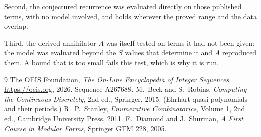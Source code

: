 \documentclass[11pt,a4paper]{article}
\theoremstyle{plain}
\theoremstyle{definition}
\begin{document}
Second, the conjectured recurrence was evaluated directly on those published terms, with no
model involved, and holds wherever the proved range and the data overlap.

Third, the derived annihilator $A$ was itself tested on terms it had not been given: the model
was evaluated beyond the $S$ values that determine it and $A$ reproduced them. A bound that is
too small fails this test, which is why it is run.

\begin{thebibliography}{9}
 The OEIS Foundation, \emph{The On-Line Encyclopedia of Integer
Sequences}, \url{https://oeis.org}, 2026. Sequence A267688.
 M.~Beck and S.~Robins, \emph{Computing the Continuous Discretely},
2nd ed., Springer, 2015. (Ehrhart quasi-polynomials and their periods.)
 R.~P.~Stanley, \emph{Enumerative Combinatorics}, Volume 1, 2nd ed.,
Cambridge University Press, 2011.
 F.~Diamond and J.~Shurman, \emph{A First Course in Modular Forms},
Springer GTM 228, 2005.
\end{thebibliography}
\end{document}
